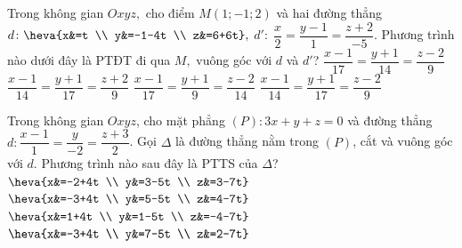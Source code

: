 \begin{ex}%
	Trong không gian $Oxyz,$ cho điểm $M\left(1;-1;2\right)$ và hai đường thẳng $d \colon \heva{x&=t \\ y&=-1-4t \\ z&=6+6t} ,$ $d' \colon \; \dfrac{x}{2} =\dfrac{y-1}{1} =\dfrac{z+2}{-5}$. Phương trình nào dưới đây là PTĐT đi qua $M,$ vuông góc với $d$ và $d'$? 
	\choice 
	{$\dfrac{x-1}{17} =\dfrac{y+1}{14} =\dfrac{z-2}{9} $}
	{$\dfrac{x-1}{14} =\dfrac{y+1}{17} =\dfrac{z+2}{9} $}
	{$\dfrac{x-1}{17} =\dfrac{y+1}{9} =\dfrac{z-2}{14} $}
	{\True $\dfrac{x-1}{14} =\dfrac{y+1}{17} =\dfrac{z-2}{9} $} 
\end{ex} 
\begin{ex}%
	Trong không gian $Oxyz$, cho mặt phẳng $\left(P\right) \colon 3x+y+z=0$ và đường thẳng $d \colon \dfrac{x-1}{1} =\dfrac{y}{-2} =\dfrac{z+3}{2} $. Gọi $\Delta $ là đường thẳng nằm trong $\left(P\right)$, cắt và vuông góc với $d$. Phương trình nào sau đây là PTTS của $\Delta $? 
	\choice 
	{$\heva{x&=-2+4t \\ y&=3-5t \\ z&=3-7t} $}
	{\True $\heva{x&=-3+4t \\ y&=5-5t \\ z&=4-7t} $}
	{$\heva{x&=1+4t \\ y&=1-5t \\ z&=-4-7t} $}
	{$\heva{x&=-3+4t \\ y&=7-5t \\ z&=2-7t} $}
\end{ex} 
